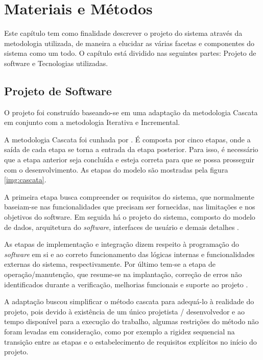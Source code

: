 \chapter{Materiais e Métodos} \label{ch:MM}

Este capítulo tem como finalidade descrever o projeto do sistema através da metodologia utilizada, de maneira a elucidar as várias facetas e componentes do sistema como um todo. O capítulo está dividido nas seguintes partes: Projeto de software e Tecnologias utilizadas.

\section{Projeto de Software} 

O projeto foi construído baseando-se em uma adaptação da metodologia Cascata em conjunto com a metodologia Iterativa e Incremental.

A metodologia Cascata foi cunhada por . É composta por cinco etapas, onde a saída de cada etapa se torna a entrada da etapa posterior. Para isso, é necessário que a etapa anterior seja concluída e esteja correta para que se possa prosseguir com o desenvolvimento. As etapas do modelo são mostradas pela figura \ref{img:cascata}.


A primeira etapa busca compreender os requisitos do sistema, que normalmente baseiam-se nas funcionalidades que precisam ser fornecidas, nas limitações e nos objetivos do software. Em seguida há o projeto do sistema, composto do modelo de dados, arquitetura do \textit{software}, interfaces de usuário e demais detalhes \cite{SITECASCATA1, SITECASCATA2}.

As etapas de implementação e integração dizem respeito à programação do \textit{software} em si e ao correto funcionamento das lógicas internas e funcionalidades externas do sistema, respectivamente. Por último tem-se a etapa de operação/manutenção, que resume-se na implantação, correção de erros não identificados durante a verificação, melhorias funcionais e suporte ao projeto \cite{SITECASCATA1, SITECASCATA2}.

A adaptação buscou simplificar o método cascata para adequá-lo à realidade do projeto, pois devido à existência de um único projetista / desenvolvedor e ao tempo disponível para a execução do trabalho, algumas restrições do método não foram levadas em consideração, como por exemplo a rigidez sequencial na transição entre as etapas e o estabelecimento de requisitos explícitos no início do projeto.

